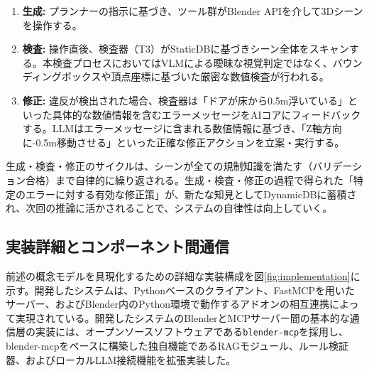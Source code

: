 \documentclass[dvipdfmx, a4paper, 9pt]{deimj}
\begin{document}
\begin{enumerate}
  \item \textbf{生成:} プランナーの指示に基づき、ツール群がBlender APIを介して3Dシーンを操作する。
  \item \textbf{検査:} 操作直後、検査器（T3）がStaticDBに基づきシーン全体をスキャンする。本検査プロセスにおいてはVLMによる曖昧な視覚判定ではなく、バウンディングボックスや頂点座標に基づいた厳密な数値検査が行われる。
  \item \textbf{修正:} 違反が検出された場合、検査器は「ドアが床から0.5m浮いている」といった具体的な数値情報を含むエラーメッセージをAIコアにフィードバックする。LLMはエラーメッセージに含まれる数値情報に基づき、「Z軸方向に-0.5m移動させる」といった正確な修正アクションを立案・実行する。
\end{enumerate}

生成・検査・修正のサイクルは、シーンが全ての規制知識を満たす（バリデーション合格）まで自律的に繰り返される。生成・検査・修正の過程で得られた「特定のエラーに対する有効な修正策」が、新たな知見としてDynamicDBに蓄積され、次回の推論に活かされることで、システムの自律性は向上していく。

\subsection{実装詳細とコンポーネント間通信}

前述の概念モデルを具現化するための詳細な実装構成を図\ref{fig:implementation}に示す。開発したシステムは、Pythonベースのクライアント、FastMCPを用いたサーバー、およびBlender内のPython環境で動作するアドオンの相互連携によって実現されている。開発したシステムのBlenderとMCPサーバー間の基本的な通信層の実装には、オープンソースソフトウェアである\texttt{blender-mcp}\cite{ahuja2025blendermcp}を採用し、blender-mcpをベースに構築した独自機能であるRAGモジュール、ルール検証器、およびローカルLLM接続機能を拡張実装した。
\end{document}
